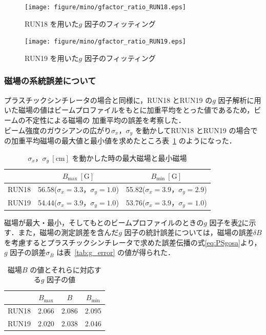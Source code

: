 \begin{figure}[H]
\begin{minipage}{0.5\hsize}
\texttt{[image: figure/mino/gfactor\_ratio\_RUN18.eps]}
\caption{RUN18 を用いた$g$ 因子のフィッティング}
\end{minipage}
\begin{minipage}{0.5\hsize}
\texttt{[image: figure/mino/gfactor\_ratio\_RUN19.eps]}
\caption{RUN19 を用いた$g$ 因子のフィッティング}
\end{minipage}
\end{figure}


\subsubsection{磁場の系統誤差について}

プラスチックシンチレータの場合と同様に，RUN18 とRUN19 の$g$ 因子解析に用いた磁場の値はビームプロファイルをもとに加重平均をとった値であるため，ビームの不定性による磁場の
加重平均の誤差を考察した．\\
ビーム強度のガウシアンの広がり$\sigma_{x}，\sigma_{y}$ を動かしてRUN18 とRUN19 の場合での加重平均磁場の最大値と最小値を求めたところ表~\ref{tab:mag_max_min} のようになった．

\begin{table}[H]
\caption{$\sigma_{x}，\sigma_{y}~[\mathrm{cm}]$ を動かした時の最大磁場と最小磁場}
\centering
\begin{tabular}{ccc}\toprule%
{} & $B_\mathrm{max}~[\mathrm{G}]$ &  $B_\mathrm{min}~[\mathrm{G}]$   \\ \midrule
RUN18 & 56.58\;($\sigma_{x}=3.3，\sigma_{y}=1.0$) & 55.82\;($\sigma_{x}=3.9，\sigma_{y}=2.9$)  \\
RUN19 & 54.44\;($\sigma_{x}=3.9，\sigma_{y}=1.0$) & 53.76\;($\sigma_{x}=3.9，\sigma_{y}=1.0$) \\ \bottomrule
\end{tabular}
\label{tab:mag_max_min}
\end{table}

磁場が最大・最小，そしてもとのビームプロファイルのときの$g$ 因子を表\ref{tab:mag_g}に示す．また，磁場の測定誤差を含んだ$g$ 因子の統計誤差については，磁場の誤差$\delta B$ を考慮するとプラスチックシンチレータで求めた誤差伝播の式\eqref{eq:PSgosa}より，$g$ 因子の誤差$\sigma_{B}$ は表~\ref{tab:g_error} の値が得られた．

\begin{table}[H]
\caption{磁場$B$ の値とそれらに対応する$g$ 因子の値}
\centering
\begin{tabular}{cccc}\toprule%
{} & $B_\mathrm{max}$ & $B$ & $B_\mathrm{min}$  \\ \midrule
RUN18 & 2.066 & 2.086 & 2.095 \\
RUN19 & 2.020 & 2.038 & 2.046 \\ \bottomrule
\end{tabular}
\label{tab:mag_g}
\end{table}

